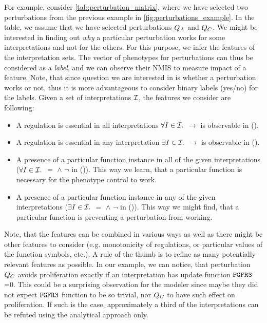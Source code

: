 For example, consider \autoref{tab:perturbation_matrix}, where we have selected two perturbations from the previous example in \autoref{fig:perturbations_example}. In the table, we assume that we have selected perturbations $Q_A$ and $Q_C$. We might be interested in finding out \emph{why} a particular perturbation works for some interpretations and not for the others. For this purpose, we infer the features of the interpretation sets. The vector of phenotypes for perturbations can thus be considered as a \emph{label}, and we can observe their NMIS to measure impact of a feature. Note, that since question we are interested in is whether a perturbation works or not, thus it is more advantageous to consider binary labels (yes/no) for the labels. 
Given a set of interpretations $\mathcal{I}$, the features we consider are following:
\begin{itemize}
  \item A regulation is essential in all interpretations $\forall I \in \mathcal{I}.$  $\rightarrow$  is observable in \pbnMath(\interpretation).
  \item A regulation is essential in any interpretation $\exists I \in \mathcal{I}.$  $\rightarrow$  is observable in \pbnMath(\interpretation).
  \item A presence of a particular function instance in 
  all of the given interpretations ($\forall I \in \mathcal{I} .$ $=$  $\land$ $\neg$  in \pbnMath(\interpretation)). This way we learn, that a particular function is necessary for the phenotype control to work.
  \item A presence of a particular function instance in any of the given interpretations ($\exists I \in \mathcal{I}.$  $=$  $\land$ $\neg$ in \pbnMath(\interpretation)). This way we might find, that a particular function is preventing a perturbation from working.
\end{itemize}

Note, that the features can be combined in various ways as well as there might be other features to consider (e.g. monotonicity of regulations, or particular values of the function symbols, etc.). A rule of the thumb is to refine as many potentially relevant features as possible. In our example, we can notice, that perturbation $Q_C$ avoids proliferation exactly if an interpretation has update function $\texttt{FGFR3}$=0. This could be a surprising observation for the modeler since maybe they did not expect $\texttt{FGFR3}$ function to be so trivial, nor $Q_C$ to have such effect on proliferation. If such is the case, approximately a third of the interpretations can be refuted using the analytical approach only.

